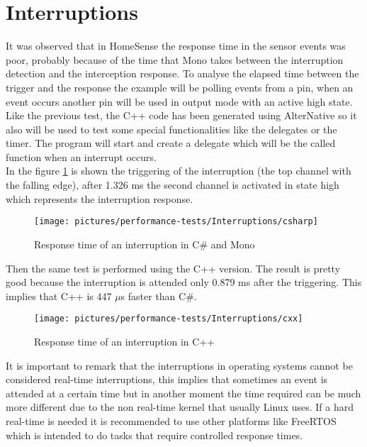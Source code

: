 \section{Interruptions}\label{S:Performance-Interruptions}
It was observed that in HomeSense the response time in the sensor events was poor, probably because of the time that Mono takes between the interruption detection and the interception response. To analyse the elapsed time between the trigger and the response the example will be polling events from a pin, when an event occurs another pin  will be used in output mode with an active high state.
\\
Like the previous test, the C++ code has been generated using AlterNative so it also will be used to test some special functionalities like the delegates or the timer. The program will start and create a delegate which will be the called function when an interrupt occurs.
\\
In the figure \ref{fig:interrupt-csharp} is shown the triggering of the interruption (the top channel with the falling edge), after 1.326 ms the second channel is activated in state high which represents the interruption response.
\begin{figure}[H]\begin{center}
 \centering
  \captionsetup{justification=centering}
  \texttt{[image: pictures/performance-tests/Interruptions/csharp]}
  \caption{Response time of an interruption in C\# and Mono\label{fig:interrupt-csharp}}
\end{center}\end{figure}
Then the same test is performed using the C++ version. The result is pretty good because the interruption is attended only 0.879 ms after the triggering. This implies that C++ is 447 $\mu$s faster than C\#.
\begin{figure}[H]\begin{center}
 \centering
  \captionsetup{justification=centering}
  \texttt{[image: pictures/performance-tests/Interruptions/cxx]}
  \caption{Response time of an interruption in C++\label{fig:interrupt-cxx}}
\end{center}\end{figure}
It is important to remark that the interruptions in operating systems cannot be considered real-time interruptions, this implies that sometimes an event is attended at a certain time but in another moment the time required can be much more different due to the non real-time kernel that usually Linux uses. If a hard real-time is needed it is recommended to use other platforms like FreeRTOS which is intended to do tasks that require controlled response times.